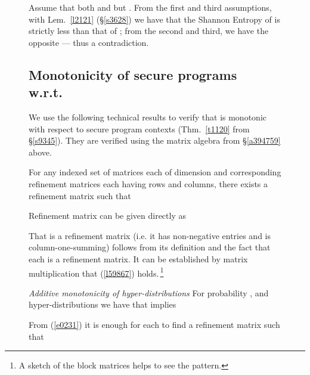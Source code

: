\documentclass[runningheads]{llncs}
\newcommand\Sec[1] {Sec.~\ref{#1}}
\newcommand\App[1] {App.~\ref{#1}}
\renewcommand\Sec[1] {\S\ref{#1}}
\renewcommand\App[1] {\S\ref{#1}}
\newcommand\Eqn[1] {(\ref{#1})}
\newenvironment{Figure}[2][t]{\begin{figure}[#1]\def\Label{#2}\small}{\label{\Label}\end{figure}}
\newenvironment{Lemma}[2]{\begin{lemma}\label{#2}\textit{#1}\rm\quad}{\hfill\end{lemma}}
\newcommand\Thm[1] {Thm.~\ref{#1}}
\newcommand\Lem[1] {Lem.~\ref{#1}}
\begin{document}
\begin{Figure}[ht!]{f1228}
Assume that both  and  but . From the first and third assumptions, with \Lem{l2121} (\App{s3628}) we have that the Shannon Entropy 
of  is strictly less than that of ; from the second and third, we have the opposite --- thus a contradiction.


\subsection{Monotonicity of secure programs w.r.t.\ } \label{a9475}

We use the following technical results to verify that  is monotonic with respect to secure program contexts (\Thm{t1120} from \Sec{s9345}). They are verified using the matrix algebra from \App{a394759} above.

\begin{Lemma}{}{l35679}
For any indexed set of matrices  each of dimension  and corresponding refinement matrices  each having  rows and  columns, there exists a refinement matrix  such that 

\begin{Proof}
Refinement matrix  can be given directly as

That  is a refinement matrix (i.e. it has non-negative entries and is column-one-summing) follows from its definition and the fact that each  is a refinement matrix. It can be established by matrix multiplication that \Eqn{l59867} holds.\,\footnote{A sketch of the block matrices helps to see the pattern.}
\end{Proof}
\end{Lemma}

\begin{Lemma}{Additive monotonicity of hyper-distributions}{l9237}
For probability , and hyper-distributions  we have that   implies 

\begin{Proof}
From \Eqn{e0231} it is enough for each  to find a refinement matrix  such that 


\end{Proof}
\end{Lemma}
\end{Figure}
\end{document}
